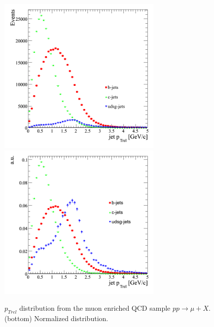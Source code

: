 \begin{figure}[htbp]
  \begin{center}
    \includegraphics[width=80mm]{Figures/jet_ptrel_muX.png}
    \includegraphics[width=80mm]{Figures/jet_ptrel_norm_muX.png}
  \end{center}
  \caption{$p_{Trel}$ distribution from the muon enriched QCD sample $pp \rightarrow \mu + X$. (bottom) Normalized distribution.}
  \label{fig:jet_ptrel_all_muX}
\end{figure}


